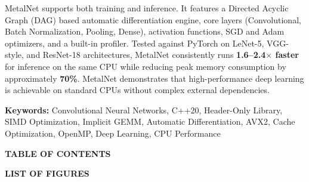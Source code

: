\documentclass[12pt,oneside,a4paper]{report}
\newcommand{\prelimheading}[1]{%
  \begin{center}
    {\Large\bfseries\color{mnPrimary} #1}
  \end{center}
  \vspace{1cm}%
}
\renewcommand{\cftchapfont}{\normalfont\sffamily\color{black!85}}
\renewcommand{\cftchappagefont}{\normalfont\color{black!85}}
\renewcommand{\cftsecfont}{\normalfont\color{black!85}}
\renewcommand{\cftsecpagefont}{\normalfont\color{black!85}}
\begin{document}
MetalNet supports both training and inference. It features a Directed Acyclic Graph (DAG) based automatic differentiation engine, core layers (Convolutional, Batch Normalization, Pooling, Dense), activation functions, SGD and Adam optimizers, and a built-in profiler. Tested against PyTorch on LeNet-5, VGG-style, and ResNet-18 architectures, MetalNet consistently runs \textbf{1.6--2.4$\times$ faster} for inference on the same CPU while reducing peak memory consumption by approximately \textbf{70\%}. MetalNet demonstrates that high-performance deep learning is achievable on standard CPUs without complex external dependencies.

\vspace{0.8cm}

\noindent \textbf{Keywords:} Convolutional Neural Networks, C++20, Header-Only Library, SIMD Optimization, Implicit GEMM, Automatic Differentiation, AVX2, Cache Optimization, OpenMP, Deep Learning, CPU Performance

\newpage

\renewcommand{\cftchappresnum}{CHAPTER }
\renewcommand{\cftchapaftersnum}{ \textendash\hspace{0.35em}}
\setlength{\cftchapnumwidth}{3.05cm}
\renewcommand{\cftchapfont}{\normalfont\bfseries\color{mnPrimary}}
\renewcommand{\cftchappagefont}{\normalfont\color{mnPrimary}}
\renewcommand{\cftsecfont}{\color{black!85}}
\renewcommand{\cftsecpagefont}{\color{black!85}}
\renewcommand{\cftchapdotsep}{\cftdotsep}
\setlength{\cftbeforechapskip}{6pt}

\vspace*{0.5cm}
\prelimheading{TABLE OF CONTENTS}
\tableofcontents

\newpage

\vspace*{0.5cm}
\prelimheading{LIST OF FIGURES}
\listoffigures
\end{document}
